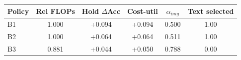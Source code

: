 \begin{tabular}{lccccc}
\toprule
Policy & Rel FLOPs & Hold $\Delta$Acc & Cost-util & $\alpha_{img}$ & Text selected \\
\midrule
B1 & 1.000 & +0.094 & +0.094 & 0.500 & 1.00 \\
B2 & 1.000 & +0.064 & +0.064 & 0.511 & 1.00 \\
B3 & 0.881 & +0.044 & +0.050 & 0.788 & 0.00 \\
\bottomrule
\end{tabular}